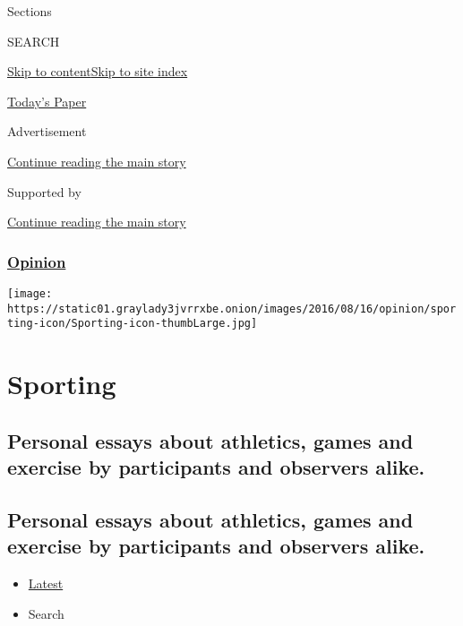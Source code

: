 Sections

SEARCH

\protect\hyperlink{site-content}{Skip to
content}\protect\hyperlink{site-index}{Skip to site index}

\href{https://myaccount.nytimes3xbfgragh.onion/auth/login?response_type=cookie\&client_id=vi}{}

\href{https://www.nytimes3xbfgragh.onion/section/todayspaper}{Today's
Paper}

Advertisement

\protect\hyperlink{after-top}{Continue reading the main story}

Supported by

\protect\hyperlink{after-sponsor}{Continue reading the main story}

\hypertarget{opinion}{%
\subsubsection{\texorpdfstring{\href{/section/opinion}{Opinion}}{Opinion}}\label{opinion}}

\texttt{[image: https://static01.graylady3jvrrxbe.onion/images/2016/08/16/opinion/sporting-icon/Sporting-icon-thumbLarge.jpg]}

\hypertarget{sporting}{%
\section{Sporting}\label{sporting}}

\hypertarget{personal-essays-about-athletics-games-and-exercise-by-participants-and-observers-alike}{%
\subsection{Personal essays about athletics, games and exercise by
participants and observers
alike.}\label{personal-essays-about-athletics-games-and-exercise-by-participants-and-observers-alike}}

\hypertarget{personal-essays-about-athletics-games-and-exercise-by-participants-and-observers-alike-1}{%
\subsection{Personal essays about athletics, games and exercise by
participants and observers
alike.}\label{personal-essays-about-athletics-games-and-exercise-by-participants-and-observers-alike-1}}

\begin{itemize}
\tightlist
\item
  \protect\hyperlink{stream-panel}{Latest}
\item
  Search
\end{itemize}

